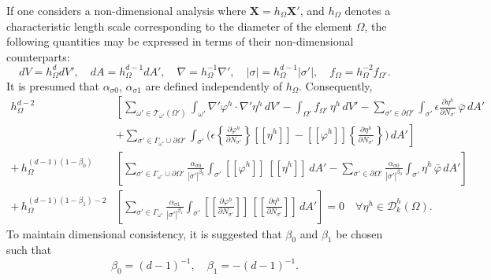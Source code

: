 	If one considers a non-dimensional analysis where $\mathbf{X} = h_\Omega \mathbf{X}'$, and $h_\Omega$ denotes a characteristic length scale corresponding to the diameter of the element $\Omega$, the following quantities may be expressed in terms of their non-dimensional counterparts:
    \begin{equation}
        dV = h_\Omega^d dV', \quad dA = h_\Omega^{d-1} dA', \quad \nabla = h_\Omega^{-1} \nabla', \quad |\sigma| = h_\Omega^{d-1} |\sigma'|, \quad f_{\Omega} = h_\Omega^{-2} f_{\Omega'}.
    \end{equation}
    It is presumed that $\alpha_{\sigma0}$, $\alpha_{\sigma1}$ are defined independently of $h_\Omega$. Consequently,
    \begin{align}
		h_\Omega^{d-2} & \left[ \sum_{\omega' \in \mathcal{T}_{\omega'} (\Omega')} \int_{\omega'} \nabla' \varphi^h \cdot \nabla' \eta^h \, dV' - \int_{\Omega'} f_{\Omega'} \, \eta^h \, dV' - \sum_{\sigma' \in \partial \Omega'} \int_{\sigma'} \epsilon \frac{\partial \eta^h}{\partial N_{\sigma'}} \, \bar{\varphi} \, dA' \right. \nonumber \\ 
		& \left. + \sum_{\sigma' \in \Gamma_{\omega'} \cup \partial \Omega'} \int_{\sigma'} \bigg( \epsilon \left\{ \frac{\partial \varphi^h}{\partial N_{\sigma'}} \right\} [\![ \eta^h ]\!] - [\![ \varphi^h ]\!] \left\{ \frac{\partial \eta^h}{\partial N_{\sigma'}} \right\}  \bigg) \, dA' \right] \nonumber \\ 
		+ \, h_\Omega^{(d-1)(1-\beta_0)} & \left[ \sum_{\sigma' \in \Gamma_{\omega'} \cup \partial \Omega'} \frac{\alpha_{\sigma0}}{|\sigma'|^{\beta_0}} \int_{\sigma'} [\![ \varphi^h ]\!] \, [\![ \eta^h ]\!] \, dA' - \sum_{\sigma' \in \partial \Omega'} \frac{\alpha_{\sigma0}}{|\sigma'|^{\beta_0}} \int_{\sigma'} \eta^h \, \bar{\varphi} \, dA' \right] \nonumber \\ 
		+ \, h_\Omega^{(d-1)(1-\beta_1)-2} & \left[ \sum_{\sigma' \in \Gamma_{\omega'}} \frac{\alpha_{\sigma1}}{|\sigma'|^{\beta_1}} \int_{\sigma'} \left[\!\!\left[ \frac{\partial \varphi^h}{\partial N_{\sigma'}} \right]\!\!\right] \, \left[\!\!\left[ \frac{\partial \eta^h}{\partial N_{\sigma'}} \right]\!\!\right] \, dA' \right] = 0 \quad \forall \eta^h \in \mathcal{D}^h_k (\Omega). 
		\label{eq:dg_nondim}
	\end{align}
	To maintain dimensional consistency, it is suggested that $\beta_0$ and $\beta_1$ be chosen such that
	\begin{equation}
		\beta_0 = (d-1)^{-1}, \quad \beta_1 = -(d-1)^{-1}.
	\end{equation}
	
